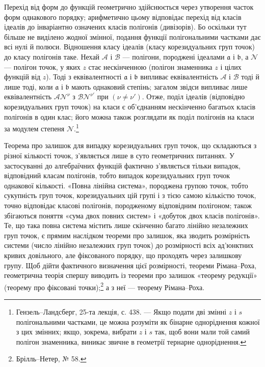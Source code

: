 \documentclass[11pt]{article}
\providecommand{\fra}{\mathfrak a}
\providecommand{\frb}{\mathfrak b}
\providecommand{\calA}{\mathcal A}
\providecommand{\calB}{\mathcal B}
\providecommand{\calN}{\mathcal N}
\begin{document}
Перехід від форм до функцій геометрично здійснюється через утворення часток форм однакового порядку; арифметично цьому відповідає перехід від класів ідеалів до інваріантно означених класів полігонів (дивізорів). Бо оскільки тут більше не виділено жодної змінної, подання функції полігональними частками дає всі нулі й полюси. Відношення класу ідеалів (класу корезидуальних груп точок) до класу полігонів таке. Нехай \(\calA\) і \(\calB\) --- полігони, породжені ідеалами \(\fra\) і \(\frb\), а \(\calN\) --- полігон точок, у яких \(z\) стає нескінченною (полігон знаменника \(z\) і цілих функцій від \(z\)). Тоді з еквівалентності \(\fra\) і \(\frb\) випливає еквівалентність \(\calA\) і \(\calB\) тоді й лише тоді, коли \(\fra\) і \(\frb\) мають однаковий степінь; загалом звідси випливає лише еквівалентність \(\calA\calN^\nu\) з \(\calB\calN^{\nu'}\) при \((\nu\ne\nu')\). Отже, поділ ідеалів (відповідно корезидуальних груп точок) на класи є об'єднанням нескінченно багатьох класів полігонів в один клас; його можна також розглядати як поділ полігонів на класи за модулем степеня \(\calN\).\footnote{Гензель--Ландсберг, 25-та лекція, с. 438. --- Якщо подати дві змінні \(z\) і \(s\) полігональними частками, це можна розуміти як бінарне одноріднення кожної з цих змінних; якщо, зокрема, вибрати \(z\) і \(s\) так, щоб вони мали той самий полігон знаменника, виникає звичне в геометрії тернарне одноріднення.}

Теорема про залишок для випадку корезидуальних груп точок, що складаються з різної кількості точок, з'являється лише в суто геометричних питаннях. У застосуванні до алгебраїчних функцій фактично з'являється тільки випадок, відповідний класам полігонів, тобто випадок корезидуальних груп точок однакової кількості. «Повна лінійна система», породжена групою точок, тобто сукупність груп точок, корезидуальних цій групі і з тією самою кількістю точок, точно відповідає класові полігонів, породженому відповідним полігоном; також збігаються поняття «сума двох повних систем» і «добуток двох класів полігонів». Те, що така повна система містить лише скінченно багато лінійно незалежних груп точок, є прямим наслідком теореми про залишок, яка зводить розмірність системи (число лінійно незалежних груп точок) до розмірності всіх ад'юнктних кривих довільного, але фіксованого порядку, що проходять через залишкову групу. Щоб дійти фактичного визначення цієї розмірності, теореми Рімана--Роха, геометрична теорія спершу виводить із теореми про залишок «теорему редукції» (теорему про фіксовані точки);\footnote{Брілль--Нетер, № 58.} а з неї --- теорему Рімана--Роха.
\end{document}
